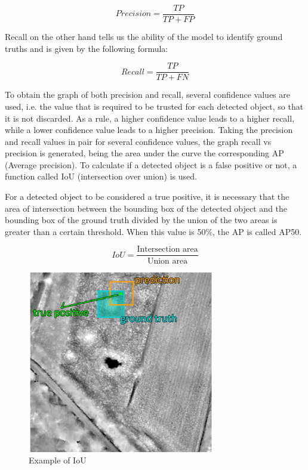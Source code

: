\begin{equation}
     Precision = \frac{TP }{TP + FP}
\end{equation}

Recall on the other hand tells us the ability of the model to identify ground truths and is given by the following formula:

\begin{equation}
     Recall = \frac{TP }{TP + FN}
\end{equation}

To obtain the graph of both precision and recall, several confidence values are used, i.e. the value that is required to be trusted for each detected object, so that it is not discarded. As a rule, a higher confidence value leads to a higher recall, while a lower confidence value leads to a higher precision. Taking the precision and recall values in pair for several confidence values, the graph recall vs precision is generated, being the area under the curve the corresponding AP (Average precision). To calculate if a detected object is a false positive or not, a function called IoU (intersection over union) is used.

For a detected object to be considered a true positive, it is necessary that the area of intersection between the bounding box of the detected object and the bounding box of the ground truth divided by the union of the two areas is greater than a certain threshold. When this value is 50\%, the AP is called AP50.

\begin{equation}
     IoU = \frac{\text{Intersection area}}{\text{Union area}}
\end{equation}

\begin{figure}[H]
\centering
\includegraphics[height=8cm]{images/IOU.png}
\caption{Example of IoU \cite{IOUpaper}}
\end{figure}

